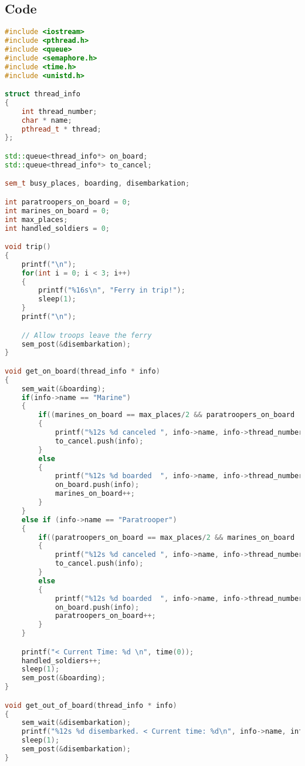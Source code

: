 \documentclass{article}
\begin{document}
 

\subsection{Code}
\begin{lstlisting}[language=C++]
#include <iostream>
#include <pthread.h>
#include <queue>
#include <semaphore.h>
#include <time.h>
#include <unistd.h>

struct thread_info 
{
    int thread_number;
    char * name;
    pthread_t * thread;
};

std::queue<thread_info*> on_board;
std::queue<thread_info*> to_cancel;

sem_t busy_places, boarding, disembarkation;

int paratroopers_on_board = 0;
int marines_on_board = 0;
int max_places;
int handled_soldiers = 0;

void trip()
{
    printf("\n");
    for(int i = 0; i < 3; i++)
    {
        printf("%16s\n", "Ferry in trip!");
        sleep(1);
    }
    printf("\n");

    // Allow troops leave the ferry
    sem_post(&disembarkation);
}

void get_on_board(thread_info * info)
{
    sem_wait(&boarding);
    if(info->name == "Marine")
    {
        if((marines_on_board == max_places/2 && paratroopers_on_board != 0) || (paratroopers_on_board > max_places/2))
        {
            printf("%12s %d canceled ", info->name, info->thread_number);
            to_cancel.push(info);
        } 
        else
        {
            printf("%12s %d boarded  ", info->name, info->thread_number);
            on_board.push(info);
            marines_on_board++;
        }
    }
    else if (info->name == "Paratrooper")
    {
        if((paratroopers_on_board == max_places/2 && marines_on_board != 0) || (marines_on_board > max_places/2))
        {
            printf("%12s %d canceled ", info->name, info->thread_number);
            to_cancel.push(info);
        }        
        else
        {
            printf("%12s %d boarded  ", info->name, info->thread_number);
            on_board.push(info);
            paratroopers_on_board++;
        }
    }

    printf("< Current Time: %d \n", time(0));
    handled_soldiers++;
    sleep(1);
    sem_post(&boarding);
}

void get_out_of_board(thread_info * info)
{
    sem_wait(&disembarkation);
    printf("%12s %d disembarked. < Current time: %d\n", info->name, info->thread_number, time(0));
    sleep(1);
    sem_post(&disembarkation);
}


\end{lstlisting}
\end{document}
